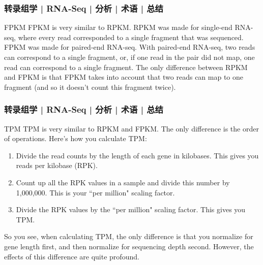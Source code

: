 \begin{frame}
  \frametitle{转录组学 | RNA-Seq | 分析 | 术语 | 总结}
  \begin{block}{FPKM}
 FPKM is very similar to RPKM. RPKM was made for single-end RNA-seq, where every read corresponded to a single fragment that was sequenced. FPKM was made for paired-end RNA-seq. With paired-end RNA-seq, two reads can correspond to a single fragment, or, if one read in the pair did not map, one read can correspond to a single fragment. The only difference between RPKM and FPKM is that FPKM takes into account that two reads can map to one fragment (and so it doesn't count this fragment twice). 
  \end{block}
\end{frame}

\begin{frame}
  \frametitle{转录组学 | RNA-Seq | 分析 | 术语 | 总结}
  \begin{block}{TPM}
    TPM is very similar to RPKM and FPKM. The only difference is the order of operations. Here's how you calculate TPM:
    \begin{enumerate}
      \item Divide the read counts by the length of each gene in kilobases. This gives you reads per kilobase (RPK).
      \item Count up all the RPK values in a sample and divide this number by 1,000,000. This is your ``per million" scaling factor.
      \item Divide the RPK values by the ``per million" scaling factor. This gives you TPM.
    \end{enumerate}
    So you see, when calculating TPM, the only difference is that you normalize for gene length first, and then normalize for sequencing depth second. However, the effects of this difference are quite profound.
  \end{block}
\end{frame}

